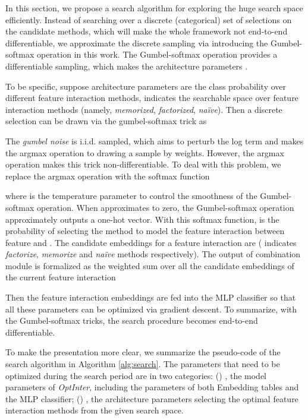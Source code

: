 \documentclass[conference]{IEEEtran}
\begin{document}
In this section, we propose a search algorithm for exploring the huge search space efficiently. Instead of searching over a discrete (categorical) set of selections on the candidate methods, which will make the whole framework not end-to-end differentiable, we approximate the discrete sampling via introducing the Gumbel-softmax operation\cite{Gumbel-Softmax} in this work. The Gumbel-softmax operation provides a differentiable sampling, which makes the architecture parameters .

To be specific, suppose architecture parameters  are the class probability over different feature interaction methods,  indicates the searchable space over feature interaction methods (namely, \emph{memorized}, \emph{factorized}, \emph{naïve}). Then a discrete selection  can be drawn via the gumbel-softmax trick\cite{Gumbel-Softmax-dist} as



The \textit{gumbel noise}  is i.i.d. sampled, which aims to perturb the log term  and makes the argmax operation  to drawing a sample by  weights. However, the argmax operation makes this trick non-differentiable. To deal with this problem, we replace the argmax operation with the softmax function

where  is the temperature parameter to control the smoothness of the Gumbel-softmax operation. When  approximates to zero, the Gumbel-softmax operation approximately outputs a one-hot vector. With this softmax function,  is the probability of selecting the method  to model the feature interaction between feature  and . 
The candidate embeddings for a feature interaction are  ( indicates \emph{factorize}, \emph{memorize} and \emph{naïve} methods respectively). The output of combination module is formalized as the weighted sum over all the candidate embeddings of the current feature interaction 



Then the feature interaction embeddings  are fed into the MLP classifier so that all these parameters can be optimized via gradient descent. To summarize, with the Gumbel-softmax tricks, the search procedure becomes end-to-end differentiable.

To make the presentation more clear, we summarize the pseudo-code of the search algorithm in Algorithm \ref{alg:search}. The parameters that need to be optimized during the search period are in two categories: () , the model parameters of \textit{OptInter}, including the parameters of both Embedding tables and the MLP classifier; () , the architecture parameters selecting the optimal feature interaction methods from the given search space.
\end{document}
